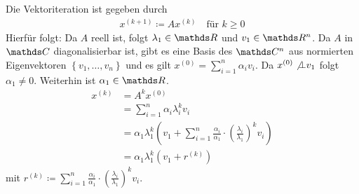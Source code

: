 \label{8.2.3}
Die Vektoriteration ist gegeben durch
\begin{gather}
  x^{(k+1)} \coloneqq Ax^{(k)} \quad \text{für } k\geq 0
  \label{VIII.2.1}
\end{gather}
Hierfür folgt:
Da $A$ reell ist, folgt $\lambda_1\in \R$ und $v_1\in\R^n$.
Da $A$ in $\C$ diagonalisierbar ist,
gibt es eine Basis des $\C^n$ aus
normierten Eigenvektoren $\left\{v_1,\ldots,v_n\right\}$
und es gilt $x^{(0)}= \sum_{i=1}^{n} \alpha_iv_i$.
Da $x^{(0)} \not \bot v_1$ folgt $\alpha_1\neq 0$.
Weiterhin ist $\alpha_1\in\R$.
\begin{align}\nonumber
  x^{(k)} &= A^kx^{(0)} \\\nonumber
          &= \sum_{i=1}^{n} \alpha_i\lambda_i^kv_i\\\nonumber
          &= \alpha_1\lambda_1^k\left(
            v_1+\sum_{i=1}^{n}\frac{\alpha_i}{\alpha_1}
            \cdot \left(\frac{\lambda_i}{\lambda_1}\right)^kv_i
            \right)\\
          &= \alpha_1\lambda_1^k\left( v_1+r^{(k)}  \right)
\label{VIII.2.2}
\end{align}
mit $r^{(k)}\coloneqq \sum_{i=1}^{n}\frac{\alpha_i}{\alpha_1}
            \cdot \left(\frac{\lambda_i}{\lambda_1}\right)^kv_i$.

